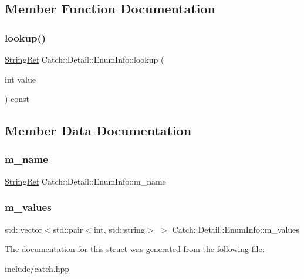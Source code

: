 \subsection{Member Function Documentation}
\mbox{\label{struct_catch_1_1_detail_1_1_enum_info_a2fdfacc411d7afb1cb690366e5e49cb3}} 
\subsubsection{\texorpdfstring{lookup()}{lookup()}}
{\footnotesize\ttfamily \mbox{\hyperlink{class_catch_1_1_string_ref}{String\+Ref}} Catch\+::\+Detail\+::\+Enum\+Info\+::lookup (\begin{DoxyParamCaption}\item[{int}]{value }\end{DoxyParamCaption}) const}



\subsection{Member Data Documentation}
\mbox{\label{struct_catch_1_1_detail_1_1_enum_info_a16ecfd3a7e11439433aabbdf6ecb676c}} 
\subsubsection{\texorpdfstring{m\_name}{m\_name}}
{\footnotesize\ttfamily \mbox{\hyperlink{class_catch_1_1_string_ref}{String\+Ref}} Catch\+::\+Detail\+::\+Enum\+Info\+::m\+\_\+name}

\mbox{\label{struct_catch_1_1_detail_1_1_enum_info_a1093082858366071bae0eba1fb3c3388}} 
\subsubsection{\texorpdfstring{m\_values}{m\_values}}
{\footnotesize\ttfamily std\+::vector$<$std\+::pair$<$int, std\+::string$>$ $>$ Catch\+::\+Detail\+::\+Enum\+Info\+::m\+\_\+values}



The documentation for this struct was generated from the following file\+:\begin{DoxyCompactItemize}
\item 
include/\mbox{\hyperlink{catch_8hpp}{catch.\+hpp}}\end{DoxyCompactItemize}
